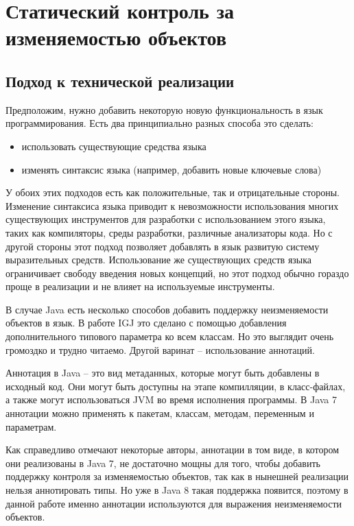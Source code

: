 \chapter{Статический контроль за изменяемостью объектов}

\section{Подход к технической реализации}

Предположим, нужно добавить некоторую новую функциональность в язык программирования. Есть два принципиально разных способа это сделать:
\begin{itemize}
	\item использовать существующие средства языка
	\item изменять синтаксис языка (например, добавить новые ключевые слова)
\end{itemize}

У обоих этих подходов есть как положительные, так и отрицательные стороны. Изменение синтаксиса языка приводит к невозможности использования многих существующих инструментов для разработки с использованием этого языка, таких как компиляторы, среды разработки, различные анализаторы кода. Но с другой стороны этот подход позволяет добавлять в язык развитую систему выразительных средств. Использование же существующих средств языка ограничивает свободу введения новых концепций, но этот подход обычно гораздо проще в реализации и не влияет на используемые инструменты.

В случае Java есть несколько способов добавить поддержку неизменяемости объектов в язык. В работе IGJ это сделано с помощью добавления дополнительного типового параметра ко всем классам. Но это выглядит очень громоздко и трудно читаемо. Другой варинат -- использование аннотаций. 

Аннотация в Java -- это вид метаданных, которые могут быть добавлены в исходный код. Они могут быть доступны на этапе компилляции, в класс-файлах, а также могут использоваться JVM во время исполнения программы. В Java 7 аннотации можно применять к пакетам, классам, методам, переменным и параметрам. 

Как справедливо отмечают некоторые авторы, аннотации в том виде, в котором они реализованы в Java 7, не достаточно мощны для того, чтобы добавить поддержку контроля за изменяемостью объектов, так как в нынешней реализации нельзя аннотировать типы. Но уже в Java 8 такая поддержка появится, поэтому в данной работе именно аннотации используются для выражения неизменяемости объектов.

